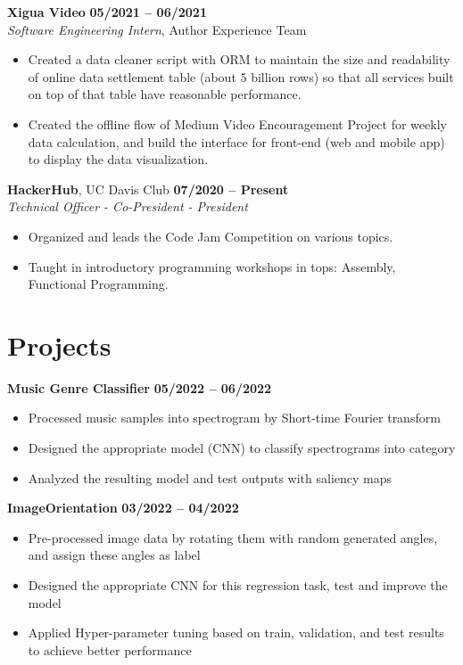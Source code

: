 \documentclass[margin,line]{res}
\begin{document}
\begin{resume}
{\bf Xigua Video} \hfill {\bf 05/2021 -- 06/2021} \\
\textit{Software Engineering Intern}, {Author Experience Team}
\begin{itemize}
	\item Created a data cleaner script with ORM to maintain the size and readability of online data settlement table (about 5 billion rows) so that all services built on top of that table have reasonable performance.
	\item Created the offline flow of Medium Video Encouragement Project for weekly data calculation, and build the interface for front-end (web and mobile app) to display the data visualization.
\end{itemize}
\vspace{-.3cm}

{\bf HackerHub}, UC Davis Club \hfill {\bf 07/2020 -- Present} \\
\textit{Technical Officer - Co-President - President}
\begin{itemize}
	\item Organized and leads the Code Jam Competition on various topics.
	\item Taught in introductory programming workshops in tops: Assembly, Functional Programming.
\end{itemize}
\vspace{-.3cm}

\section{\sc Projects}
{\bf Music Genre Classifier} \hfill {\bf 05/2022 -- 06/2022} \\
\begin{itemize}
	\item Processed music samples into spectrogram by Short-time Fourier transform
	\item Designed the appropriate model (CNN) to classify spectrograms into category
	\item Analyzed the resulting model and test outputs with saliency maps
\end{itemize}
\vspace{-.3cm}

{\bf ImageOrientation} \hfill {\bf 03/2022 -- 04/2022} \\
\begin{itemize}
	\item Pre-processed image data by rotating them with random generated angles, and assign these angles as label
	\item Designed the appropriate CNN for this regression task, test and improve the model
	\item Applied Hyper-parameter tuning based on train, validation, and test results to achieve better performance
\end{itemize}
\vspace{-.3cm}


\end{resume}
\end{document}
